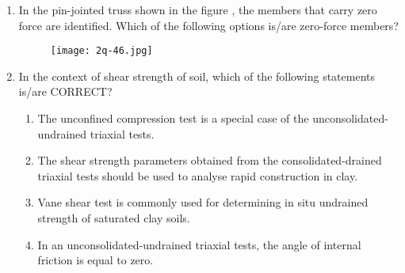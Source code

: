 \documentclass[journal,12pt,onecolumn]{article}
\theoremstyle{remark}
\begin{document}
\begin{enumerate}
    \hfill{}
    \begin{enumerate}
    \end{enumerate}

    \item In the pin-jointed truss shown in the figure , the members that carry zero force are identified. Which of the following options is/are zero-force members?
    \begin{figure}[H]
        \centering
        \texttt{[image: 2q-46.jpg]}
        \caption{}
        \label{fig:q46}
    \end{figure}

    \hfill{}
    \begin{enumerate}
    \end{enumerate}

    \item In the context of shear strength of soil, which of the following statements is/are CORRECT?

    \hfill{}
    \begin{enumerate}
        \item The unconfined compression test is a special case of the unconsolidated-undrained  triaxial tests.
        \item The shear strength parameters obtained from the consolidated-drained  triaxial tests should be used to analyse rapid construction in clay.
        \item Vane shear test is commonly used for determining in situ undrained strength of saturated clay soils.
        \item In an unconsolidated-undrained  triaxial tests, the angle of internal friction \brak{\phi} is equal to zero.
    \end{enumerate}


\end{enumerate}
\end{document}
